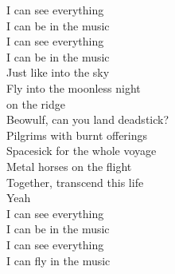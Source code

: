 I can see everything \\
I can be in the music \\
I can see everything \\
I can be in the music \\

Just like  into the sky \\
Fly into the moonless night \\
 on the ridge \\
Beowulf, can you land deadstick? \\
Pilgrims with burnt offerings \\
Spacesick for the whole voyage \\
Metal horses on the flight \\
Together, transcend this life \\
Yeah \\

I can see everything \\
I can be in the music \\
I can see everything \\
I can fly in the music \\
